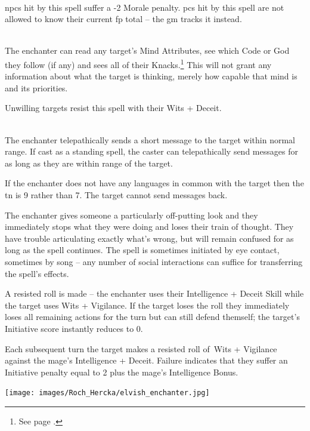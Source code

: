 \begin{multicols}{2}
{\\
\Glspl{npc} hit by this spell suffer a -2 Morale penalty.  \Glspl{pc} hit by this spell are not allowed to know their current \gls{fp} total -- the \gls{gm} tracks it instead.

\\
The enchanter can read any target's Mind Attributes, see which Code or God they follow (if any) and sees all of their Knacks.\footnote{See page \pageref{gods_codes}.}
This will not grant any information about what the target is thinking, merely how capable that mind is and its priorities.

Unwilling targets resist this spell with their Wits + Deceit.

\\
The enchanter telepathically sends a short message to the target within normal range. If cast as a standing spell, the caster can telepathically send messages for as long as they are within range of the target.

If the enchanter does not have any languages in common with the target then the \gls{tn} is 9 rather than 7. The target cannot send messages back.

\spelllevel


The enchanter gives someone a particularly off-putting look and they immediately stops what they were doing and loses their train of thought.
They have trouble articulating exactly what's wrong, but will remain confused for as long as the spell continues.
The spell is sometimes initiated by eye contact, sometimes by song -- any number of social interactions can suffice for transferring the spell's effects.

A resisted roll is made -- the enchanter uses their Intelligence + Deceit Skill while the target uses Wits + Vigilance.
If the target loses the roll they immediately loses all remaining actions for the turn but can still defend themself; the target's Initiative score instantly reduces to 0.

Each subsequent turn the target makes a resisted roll of\ Wits + Vigilance against the mage's Intelligence + Deceit. Failure indicates that they suffer an Initiative penalty equal to 2 plus the mage's Intelligence Bonus.

	\noindent\texttt{[image: images/Roch\_Hercka/elvish\_enchanter.jpg]}
	\label{roch:enchanter}
}{}


\end{multicols}
